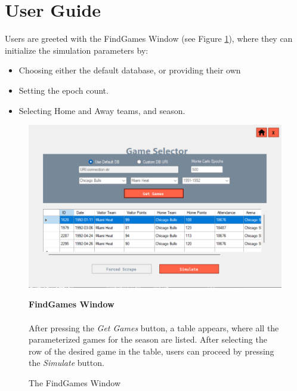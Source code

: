 \documentclass{thesis-ekf}
\theoremstyle{definition}
\theoremstyle{remark}
\begin{document}
\section{User Guide}
Users are greeted with the FindGames Window (see Figure \ref{img-findgames}), where they can initialize the simulation parameters by:
\begin{itemize}
	\item Choosing either the default database, or providing their own
	\item Setting the epoch count.
	\item Selecting Home and Away teams, and season.
\end{itemize} 



\begin{figure}[h]
	\begin{minipage}{0.69\textwidth}
		\centering
		\includegraphics[width=\textwidth]{img/user-guide/FindGame}
		\caption{The FindGames Window}
		\label{img-findgames}
	\end{minipage}
	\hfill
	\begin{minipage}{0.28\textwidth}
		\textbf{FindGames Window} \\ \\
		After pressing the \emph{Get Games} button, a table appears, where all the parameterized games for the season are listed. After selecting the row of the desired game in the table, users can proceed by pressing the \emph{Simulate} button.
	\end{minipage}
\end{figure}
\end{document}
